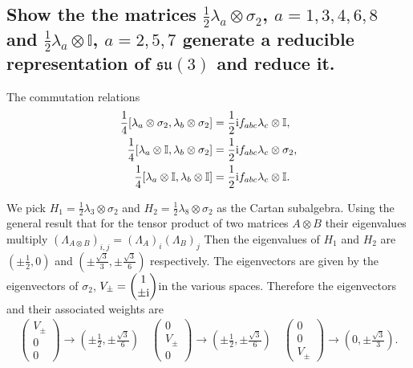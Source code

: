 \documentclass[main.tex]{subfiles}
\begin{document}
\subsection{Show the the matrices $\frac{1}{2}\lambda_a\otimes\sigma_2$, $a=1,3,4,6,8$ and $\frac{1}{2}\lambda_a\otimes\mathbb{I}$, $a=2,5,7$ generate a reducible representation of $\mathfrak{su}(3)$ and reduce it.}
The commutation relations
\begin{align}
\frac{1}{4}[\lambda_a\otimes\sigma_2,\lambda_b\otimes\sigma_2]&=\frac{1}{2}\mathrm{i} f_{abc}\lambda_c\otimes\mathbb{I},\\ \frac{1}{4}[\lambda_a\otimes\mathbb{I},\lambda_b\otimes\sigma_2]&=\frac{1}{2}\mathrm{i} f_{abc}\lambda_c\otimes\sigma_2,\\
\frac{1}{4}[\lambda_a\otimes\mathbb{I},\lambda_b\otimes\mathbb{I}]&=\frac{1}{2}\mathrm{i} f_{abc}\lambda_c\otimes\mathbb{I}.
\end{align}

We pick $H_1=\frac{1}{2}\lambda_3\otimes\sigma_2$ and $H_2=\frac{1}{2}\lambda_8\otimes\sigma_2$ as the Cartan subalgebra. Using the general result that for the tensor product of two matrices $A\otimes B$ their eigenvalues multiply ${(\Lambda_{A\otimes B})}_{i,j}={(\Lambda_{A})}_i{(\Lambda_{B})}_j$ Then the eigenvalues of $H_1$ and $H_2$ are $(\pm\frac{1}{2}, 0)$ and $(\pm\frac{\sqrt{3}}{3}, \pm\frac{\sqrt{3}}{6})$ respectively. The eigenvectors are given by the eigenvectors of $\sigma_2$, $V_{\pm}=\begin{pmatrix}1\\\pm\mathrm{i}\end{pmatrix}$in the various spaces. Therefore the eigenvectors and their associated weights are
\begin{align}
\begin{pmatrix}V_{\pm}\\0\\0\end{pmatrix}\rightarrow(\pm\frac{1}{2},\pm\frac{\sqrt{3}}{6})\quad \begin{pmatrix}0\\V_{\pm}\\0\end{pmatrix}\rightarrow(\pm\frac{1}{2},\pm\frac{\sqrt{3}}{6})\quad
\begin{pmatrix}0\\0\\V_{\pm}\end{pmatrix}\rightarrow(0,\pm\frac{\sqrt{3}}{3}).
\end{align}
\end{document}

